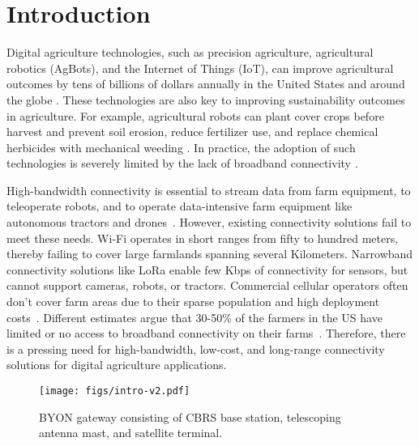 \section{Introduction}
\label{sec:intro}

Digital agriculture technologies, such as precision agriculture, agricultural robotics (AgBots), and the Internet of Things (IoT), can improve agricultural outcomes by tens of billions of dollars annually in the United States \cite{usda_report, fcc_report, mckinsey_agriculture_2020} and around the globe \cite{mehrabi_global_2021, 30_percent_no_internet, govuk_ruraldrive_2023}. These technologies are also key to improving sustainability outcomes in agriculture. For example, agricultural robots can plant cover crops before harvest and prevent soil erosion, reduce fertilizer use, and replace chemical herbicides with mechanical weeding \cite{digital_transformation_madhu, farmprogress_robot, mckinsey_agriculture_2020}. In practice, the adoption of such technologies is severely limited by the lack of broadband connectivity \cite{30_percent_no_internet, usda_report, comparing_on-farm_connectivity, mehrabi_global_2021}.

High-bandwidth connectivity is essential to stream data from farm equipment, to teleoperate robots, and to operate data-intensive farm equipment like autonomous tractors and drones~\cite{johndeere,johndeere2,mckinsey_agriculture_2020}. However, existing connectivity solutions fail to meet these needs. Wi-Fi operates in short ranges from fifty to hundred meters, thereby failing to cover large farmlands spanning several Kilometers. Narrowband connectivity solutions like LoRa enable few Kbps of connectivity for sensors, but cannot support cameras, robots, or tractors. Commercial cellular operators often don't cover farm areas due to their sparse population and high deployment costs~\cite{usb_report, 30_percent_no_internet}. Different estimates argue that 30-50\% of the farmers in the US have limited or no access to broadband connectivity on their farms~\cite{usb_report, 30_percent_no_internet}. Therefore, there is a pressing need for high-bandwidth, low-cost, and long-range connectivity solutions for digital agriculture applications. %



\begin{figure}[t]
    \centering
    \texttt{[image: figs/intro-v2.pdf]}
    \vspace{-0.1in}
    \caption{BYON gateway consisting of CBRS base station, telescoping antenna mast, and satellite terminal.}%
    \label{fig:byon}
    \vspace{-0.20in}
\end{figure}

